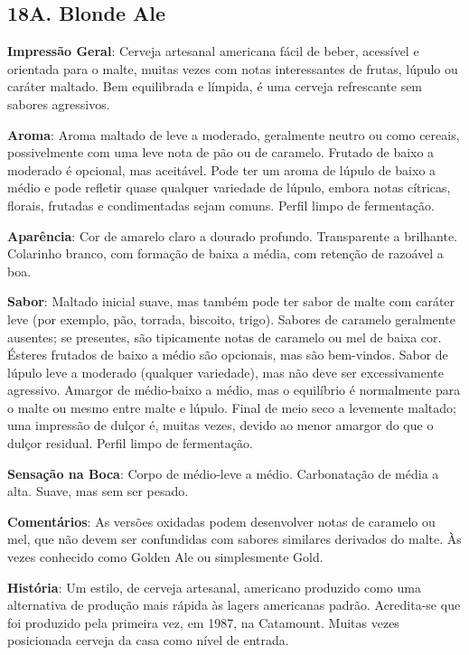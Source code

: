\subsection*{18A. Blonde Ale}
\textbf{Impressão Geral}: Cerveja artesanal americana fácil de beber, acessível e orientada para o malte, muitas vezes com notas interessantes de frutas, lúpulo ou caráter maltado. Bem equilibrada e límpida, é uma cerveja refrescante sem sabores agressivos.

\textbf{Aroma}: Aroma maltado de leve a moderado, geralmente neutro ou como cereais, possivelmente com uma leve nota de pão ou de caramelo. Frutado de baixo a moderado é opcional, mas aceitável. Pode ter um aroma de lúpulo de baixo a médio e pode refletir quase qualquer variedade de lúpulo, embora notas cítricas, florais, frutadas e condimentadas sejam comuns. Perfil limpo de fermentação.

\textbf{Aparência}: Cor de amarelo claro a dourado profundo. Transparente a brilhante. Colarinho branco, com formação de baixa a média, com retenção de razoável a boa.

\textbf{Sabor}: Maltado inicial suave, mas também pode ter sabor de malte com caráter leve (por exemplo, pão, torrada, biscoito, trigo). Sabores de caramelo geralmente ausentes; se presentes, são tipicamente notas de caramelo ou mel de baixa cor. Ésteres frutados de baixo a médio são opcionais, mas são bem-vindos. Sabor de lúpulo leve a moderado (qualquer variedade), mas não deve ser excessivamente agressivo. Amargor de médio-baixo a médio, mas o equilíbrio é normalmente para o malte ou mesmo entre malte e lúpulo. Final de meio seco a levemente maltado; uma impressão de dulçor é, muitas vezes, devido ao menor amargor do que o dulçor residual. Perfil limpo de fermentação.

\textbf{Sensação na Boca}: Corpo de médio-leve a médio. Carbonatação de média a alta. Suave, mas sem ser pesado.

\textbf{Comentários}: As versões oxidadas podem desenvolver notas de caramelo ou mel, que não devem ser confundidas com sabores similares derivados do malte. Às vezes conhecido como Golden Ale ou simplesmente Gold.

\textbf{História}: Um estilo, de cerveja artesanal, americano produzido como uma alternativa de produção mais rápida às lagers americanas padrão. Acredita-se que foi produzido pela primeira vez, em 1987, na Catamount. Muitas vezes posicionada cerveja da casa como nível de entrada.


